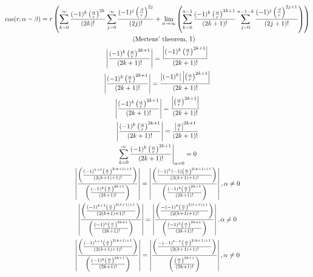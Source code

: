 \documentclass[a4paper,12pt]{report}
\newcommand{\equationnote}[1]{%
    \refstepcounter{equation}%
    \tag{#1, \theequation}%
}
\begin{document}
\begin{landscape}
{\begin{gather}
\cos(r,\alpha - \beta) = r \left(\sum \limits_{k=0}^{\infty} \frac{(-1)^k \left(\frac{\alpha}{r}\right)^{2k}}{(2k)!} \sum \limits_{j=0}^{\infty} \frac{(-1)^j \left(\frac{\beta}{r}\right)^{2j}}{(2j)!} + \lim \limits_{n \to \infty} \left(\sum \limits_{k=0}^{n-1} \frac{(-1)^k \left(\frac{\alpha}{r}\right)^{2k+1}}{(2k+1)!} \sum \limits_{j=0}^{n-1-k} \frac{(-1)^j \left(\frac{\beta}{r}\right)^{2j+1}}{(2j+1)!}\right)\right) \notag \\
\equationnote{Mertens' theorem} \\
\left|\frac{(-1)^k \left(\frac{\alpha}{r}\right)^{2k+1}}{(2k+1)!}\right| = \frac{\left|(-1)^k \left(\frac{\alpha}{r}\right)^{2k+1}\right|}{(2k+1)!} \\
\left|\frac{(-1)^k \left(\frac{\alpha}{r}\right)^{2k+1}}{(2k+1)!}\right| = \frac{\left|(-1)^k\right| \left|\left(\frac{\alpha}{r}\right)^{2k+1}\right|}{(2k+1)!} \\
\left|\frac{(-1)^k \left(\frac{\alpha}{r}\right)^{2k+1}}{(2k+1)!}\right| = \frac{\left|\left(\frac{\alpha}{r}\right)^{2k+1}\right|}{(2k+1)!} \\
\left|\frac{(-1)^k \left(\frac{\alpha}{r}\right)^{2k+1}}{(2k+1)!}\right| = \frac{\left|\frac{\alpha}{r}\right|^{2k+1}}{(2k+1)!} \\
\left.\sum \limits_{k=0}^{\infty} \frac{(-1)^k \left(\frac{\alpha}{r}\right)^{2k+1}}{(2k+1)!}\right|_{\alpha=0} = 0 \\
\left|\frac{\left(\frac{(-1)^{k+1} \left(\frac{\alpha}{r}\right)^{2(k+1)+1}}{(2(k+1)+1)!}\right)}{\left(\frac{(-1)^k \left(\frac{\alpha}{r}\right)^{2k+1}}{(2k+1)!}\right)}\right| = \left|\frac{\left(\frac{(-1)^k(-1)\left(\frac{\alpha}{r}\right)^{2(k+1)+1}}{(2(k+1)+1)!}\right)}{\left(\frac{(-1)^k \left(\frac{\alpha}{r}\right)^{2k+1}}{(2k+1)!}\right)}\right|, \alpha \neq 0 \\
\left|\frac{\left(\frac{(-1)^{k+1} \left(\frac{\alpha}{r}\right)^{2(k+1)+1}}{(2(k+1)+1)!}\right)}{\left(\frac{(-1)^k \left(\frac{\alpha}{r}\right)^{2k+1}}{(2k+1)!}\right)}\right| = \left|\frac{\left(\frac{-(-1)^k\left(\frac{\alpha}{r}\right)^{2(k+1)+1}}{(2(k+1)+1)!}\right)}{\left(\frac{(-1)^k \left(\frac{\alpha}{r}\right)^{2k+1}}{(2k+1)!}\right)}\right|, \alpha \neq 0 \\
\left|\frac{\left(\frac{(-1)^{k+1} \left(\frac{\alpha}{r}\right)^{2(k+1)+1}}{(2(k+1)+1)!}\right)}{\left(\frac{(-1)^k \left(\frac{\alpha}{r}\right)^{2k+1}}{(2k+1)!}\right)}\right| = \left|\frac{\left(\frac{-(-1)^{k-k}\left(\frac{\alpha}{r}\right)^{2(k+1)+1}}{(2(k+1)+1)!}\right)}{\left(\frac{\left(\frac{\alpha}{r}\right)^{2k+1}}{(2k+1)!}\right)}\right|, \alpha \neq 0 \\

\end{gather}}
\end{landscape}
\end{document}
